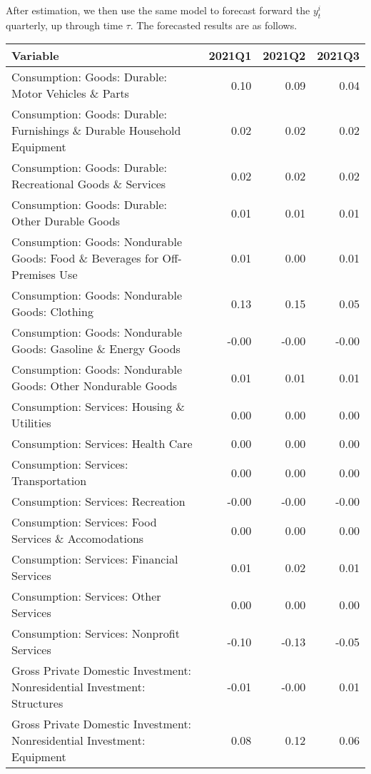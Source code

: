 \documentclass[11pt, letterpaper]{article}\usepackage[]{graphicx}\usepackage[]{color}
\begin{document}
After estimation, we then use the same model to forecast forward the $y^i_t$ quarterly, up through time $\tau$. 
The forecasted results are as follows.
\begin{table}[H]
\centering
\begingroup\scriptsize
\begin{tabular}{lrrr}
  \hline
Variable & 2021Q1 & 2021Q2 & 2021Q3 \\ 
  \hline
Consumption: Goods: Durable: Motor Vehicles \& Parts & 0.10 & 0.09 & 0.04 \\ 
  Consumption: Goods: Durable: Furnishings \& Durable Household Equipment & 0.02 & 0.02 & 0.02 \\ 
  Consumption: Goods: Durable: Recreational Goods \& Services & 0.02 & 0.02 & 0.02 \\ 
  Consumption: Goods: Durable: Other Durable Goods & 0.01 & 0.01 & 0.01 \\ 
  Consumption: Goods: Nondurable Goods: Food \& Beverages for Off-Premises Use & 0.01 & 0.00 & 0.01 \\ 
  Consumption: Goods: Nondurable Goods: Clothing & 0.13 & 0.15 & 0.05 \\ 
  Consumption: Goods: Nondurable Goods: Gasoline \& Energy Goods & -0.00 & -0.00 & -0.00 \\ 
  Consumption: Goods: Nondurable Goods: Other Nondurable Goods & 0.01 & 0.01 & 0.01 \\ 
  Consumption: Services: Housing \& Utilities & 0.00 & 0.00 & 0.00 \\ 
  Consumption: Services: Health Care & 0.00 & 0.00 & 0.00 \\ 
  Consumption: Services: Transportation & 0.00 & 0.00 & 0.00 \\ 
  Consumption: Services: Recreation & -0.00 & -0.00 & -0.00 \\ 
  Consumption: Services: Food Services \& Accomodations & 0.00 & 0.00 & 0.00 \\ 
  Consumption: Services: Financial Services & 0.01 & 0.02 & 0.01 \\ 
  Consumption: Services: Other Services & 0.00 & 0.00 & 0.00 \\ 
  Consumption: Services: Nonprofit Services & -0.10 & -0.13 & -0.05 \\ 
  Gross Private Domestic Investment: Nonresidential Investment: Structures & -0.01 & -0.00 & 0.01 \\ 
  Gross Private Domestic Investment: Nonresidential Investment: Equipment & 0.08 & 0.12 & 0.06 \\ 

\end{tabular}
\end{table}
\end{document}
